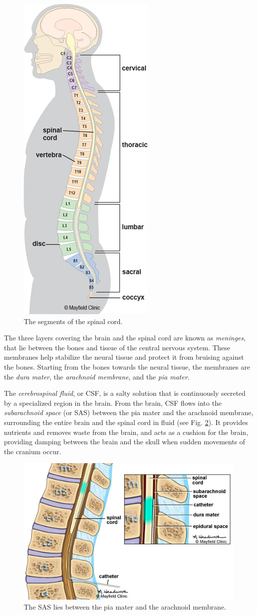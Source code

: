 \documentclass[a4paper,11pt,openright,twoside]{book}
\begin{document}
\begin{figure}[h!]
\centering
\includegraphics[width=.3\textwidth]{images/spine}
\caption{The segments of the spinal cord.}
\label{img:cns:2}
\end{figure}


The three layers covering the brain and the spinal cord are known as \emph{meninges}, that lie between the bones and tissue of the central nervous system. These membranes help stabilize the neural tissue and protect it from bruising against the bones. Starting from the bones towards the neural tissue, the membranes are the \emph{dura mater}, the \emph{arachnoid membrane}, and the \emph{pia mater}.

The \emph{cerebrospinal fluid}, or CSF, is a salty solution that is continuously secreted by a specialized region in the brain. From the brain, CSF flows into the \emph{subarachnoid space} (or SAS) between the pia mater and the arachnoid membrane, surrounding the entire brain and the spinal cord in fluid (see Fig. \ref{img:cns:3}). It provides nutrients and removes waste from the brain, and acts as a cushion for the brain, providing damping between the brain and the skull when sudden movements of the cranium occur.


\begin{figure}[h!]
\centering
\includegraphics[width=.6\textwidth]{images/sas}
\caption{The SAS lies between the pia mater and the arachnoid membrane.}
\label{img:cns:3}
\end{figure}
\end{document}
